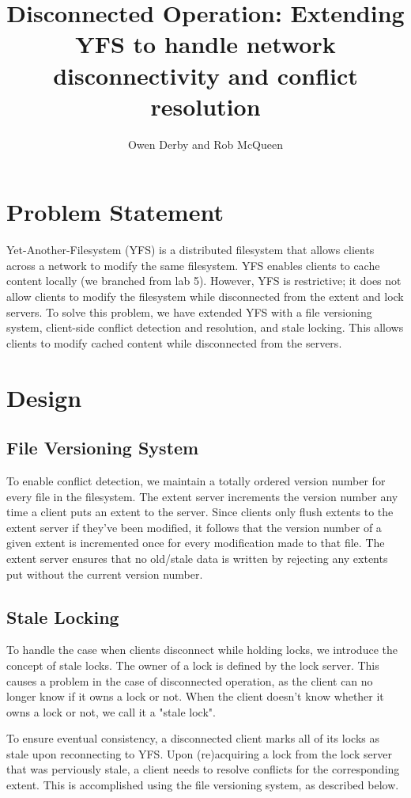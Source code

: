 \documentclass[11pt]{article}
\title{Disconnected Operation: Extending YFS to handle network disconnectivity and conflict resolution}
\author{Owen Derby and Rob McQueen}
\begin{document}
\maketitle 

\section{Problem Statement}
Yet-Another-Filesystem (YFS) is a distributed filesystem that allows clients across a network to modify the same filesystem. YFS enables clients to cache content locally (we branched from lab 5). However, YFS is restrictive; it does not allow clients to modify the filesystem while disconnected from the extent and lock servers. To solve this problem, we have extended YFS with a file versioning system, client-side conflict detection and resolution, and stale locking. This allows clients to modify cached content while disconnected from the servers.

\section{Design}
\subsection{File Versioning System}
To enable conflict detection, we maintain a totally ordered version number for every file in the filesystem. The extent server increments the version number any time a client puts an extent to the server. Since clients only flush extents to the extent server if they've been modified, it follows that the version number of a given extent is incremented once for every modification made to that file. The extent server ensures that no old/stale data is written by rejecting any extents put without the current version number.

\subsection{Stale Locking}
To handle the case when clients disconnect while holding locks, we introduce the concept of stale locks. The owner of a lock is defined by the lock server. This causes a problem in the case of disconnected operation, as the client can no longer know if it owns a lock or not. When the client doesn't know whether it owns a lock or not, we call it a "stale lock".

To ensure eventual consistency, a disconnected client marks all of its locks as stale upon reconnecting to YFS. Upon (re)acquiring a lock from the lock server that was perviously stale, a client needs to resolve conflicts for the corresponding extent. This is accomplished using the file versioning system, as described below.
\end{document}
